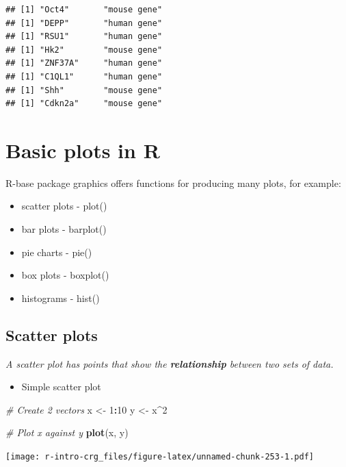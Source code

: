 \documentclass[]{book}
\newenvironment{Shaded}{\begin{snugshade}}{\end{snugshade}}
\newcommand{\CommentTok}[1]{\textcolor[rgb]{0.56,0.35,0.01}{\textit{#1}}}
\newcommand{\DecValTok}[1]{\textcolor[rgb]{0.00,0.00,0.81}{#1}}
\newcommand{\KeywordTok}[1]{\textcolor[rgb]{0.13,0.29,0.53}{\textbf{#1}}}
\newcommand{\NormalTok}[1]{#1}
\newcommand{\OperatorTok}[1]{\textcolor[rgb]{0.81,0.36,0.00}{\textbf{#1}}}
\newcommand{\StringTok}[1]{\textcolor[rgb]{0.31,0.60,0.02}{#1}}
\providecommand{\tightlist}{%
  \setlength{\itemsep}{0pt}\setlength{\parskip}{0pt}}
\begin{document}
\begin{verbatim}
## [1] "Oct4"       "mouse gene"
## [1] "DEPP"       "human gene"
## [1] "RSU1"       "human gene"
## [1] "Hk2"        "mouse gene"
## [1] "ZNF37A"     "human gene"
## [1] "C1QL1"      "human gene"
## [1] "Shh"        "mouse gene"
## [1] "Cdkn2a"     "mouse gene"
\end{verbatim}

\hypertarget{basic-plots-in-r}{%
\chapter{Basic plots in R}\label{basic-plots-in-r}}

R-base package graphics offers functions for producing many plots, for example:

\begin{itemize}
\tightlist
\item
  scatter plots - plot()
\item
  bar plots - barplot()
\item
  pie charts - pie()
\item
  box plots - boxplot()
\item
  histograms - hist()
\end{itemize}

\hypertarget{scatter-plots}{%
\section{Scatter plots}\label{scatter-plots}}

\emph{A scatter plot has points that show the \textbf{relationship} between two sets of data.}

\begin{itemize}
\tightlist
\item
  Simple scatter plot
\end{itemize}

\begin{Shaded}
\begin{Highlighting}[]
\CommentTok{# Create 2 vectors}
\NormalTok{x <-}\StringTok{ }\DecValTok{1}\OperatorTok{:}\DecValTok{10}
\NormalTok{y <-}\StringTok{ }\NormalTok{x}\OperatorTok{^}\DecValTok{2}

\CommentTok{# Plot x against y}
\KeywordTok{plot}\NormalTok{(x, y)}
\end{Highlighting}
\end{Shaded}

\texttt{[image: r-intro-crg\_files/figure-latex/unnamed-chunk-253-1.pdf]}
\end{document}
